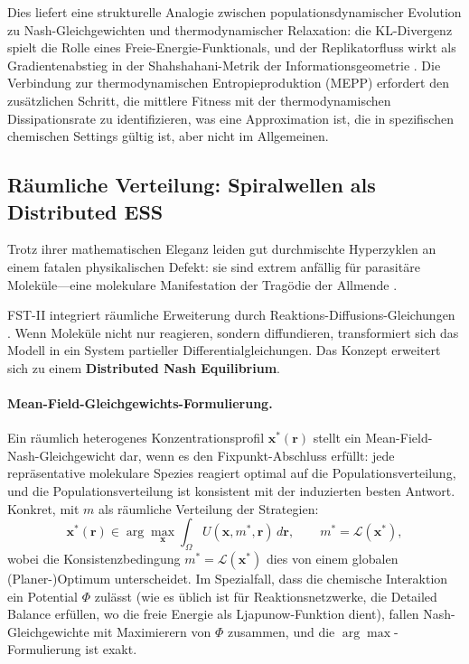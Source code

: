 \documentclass[12pt,a4paper]{article}
\theoremstyle{remark}
\begin{document}
Dies liefert eine strukturelle Analogie zwischen populationsdynamischer Evolution zu Nash-Gleichgewichten und thermodynamischer Relaxation: die KL-Divergenz spielt die Rolle eines Freie-Energie-Funktionals, und der Replikatorfluss wirkt als Gradientenabstieg in der Shahshahani-Metrik der Informationsgeometrie \citep{ReplicatorEntropy}. Die Verbindung zur thermodynamischen Entropieproduktion (MEPP) erfordert den zus\"atzlichen Schritt, die mittlere Fitness mit der thermodynamischen Dissipationsrate zu identifizieren, was eine Approximation ist, die in spezifischen chemischen Settings g\"ultig ist, aber nicht im Allgemeinen.

\subsection{R\"aumliche Verteilung: Spiralwellen als Distributed ESS}

Trotz ihrer mathematischen Eleganz leiden gut durchmischte Hyperzyklen an einem fatalen physikalischen Defekt: sie sind extrem anf\"allig f\"ur parasit\"are Molek\"ule---eine molekulare Manifestation der Trag\"odie der Allmende \citep{HypercycleInfinite}.

FST-II integriert r\"aumliche Erweiterung durch Reaktions-Diffusions-Gleichungen \citep{ReplicatorDiffusion}. Wenn Molek\"ule nicht nur reagieren, sondern diffundieren, transformiert sich das Modell in ein System partieller Differentialgleichungen. Das Konzept erweitert sich zu einem \textbf{Distributed Nash Equilibrium}.

\paragraph{Mean-Field-Gleichgewichts-Formulierung.}
Ein r\"aumlich heterogenes Konzentrationsprofil $\mathbf{x}^*(\mathbf{r})$ stellt ein Mean-Field-Nash-Gleichgewicht dar, wenn es den Fixpunkt-Abschluss erf\"ullt: jede repr\"asentative molekulare Spezies reagiert optimal auf die Populationsverteilung, und die Populationsverteilung ist konsistent mit der induzierten besten Antwort. Konkret, mit $m$ als r\"aumliche Verteilung der Strategien:
\begin{equation}
\mathbf{x}^*(\mathbf{r}) \in \arg\max_{\mathbf{x}} \int_\Omega U(\mathbf{x}, m^*, \mathbf{r}) \, d\mathbf{r}, \qquad m^* = \mathcal{L}(\mathbf{x}^*),
\end{equation}
wobei die Konsistenzbedingung $m^* = \mathcal{L}(\mathbf{x}^*)$ dies von einem globalen (Planer-)Optimum unterscheidet. Im Spezialfall, dass die chemische Interaktion ein Potential $\Phi$ zul\"asst (wie es \"ublich ist f\"ur Reaktionsnetzwerke, die Detailed Balance erf\"ullen, wo die freie Energie als Ljapunow-Funktion dient), fallen Nash-Gleichgewichte mit Maximierern von $\Phi$ zusammen, und die $\arg\max$-Formulierung ist exakt.
\end{document}
